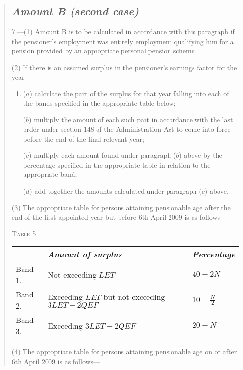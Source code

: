 \documentclass[12pt,a4paper]{article}
\begin{document}
\begin{quotation}
\subsection*{\itshape Amount B (second case)}

7.---(1) Amount B is to be calculated in accordance with this paragraph if the pensioner’s employment was entirely employment qualifying him for a pension provided by an appropriate personal pension scheme.

(2) If there is an assumed surplus in the pensioner’s earnings factor for the year—
\begin{enumerate}\item[]
($a$) calculate the part of the surplus for that year falling into each of the bands specified in the appropriate table below;

($b$) multiply the amount of each such part in accordance with the last order under section 148 of the Administration Act to come into force before the end of the final relevant year;

($c$) multiply each amount found under paragraph ($b$)  above by the percentage specified in the appropriate table in relation to the appropriate band;

($d$) add together the amounts calculated under paragraph ($c$)  above.
\end{enumerate}

(3) The appropriate table for persons attaining pensionable age after the end of the first appointed year but before 6th April 2009 is as follows—

\pagebreak[3]

\noindent\textsc{Table 5}

{\noindent\footnotesize
\begin{longtable}{lll}
\hline
&\itshape Amount of surplus	&\itshape Percentage\\
\hline
\endhead
\hline
\endlastfoot
Band 1. 	&Not exceeding $LET$	&$40 + 2N$\\
Band 2. 	&Exceeding $LET$ but not exceeding $3LET - 2QEF$	&$10 + \frac{N}{2}$\\
Band 3. 	&Exceeding $3LET - 2QEF$	&$20 + N$\\
\end{longtable}

}

(4) The appropriate table for persons attaining pensionable age on or after 6th April 2009 is as follows—


\end{quotation}
\end{document}
